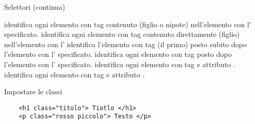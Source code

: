 \begin{frame}[fragile]{Selettori (continua)}\transfade\centering
  \begin{description}[<+->]
    \itemtt[\#id \mintcss{p}] identifica ogni elemento con tag  contenuto (figlio o nipote) nell'elemento con l' specificato.
    \itemtt[\#id>\mintcss{p}] identifica ogni elemento con tag  contenuto direttamente (figlio) nell'elemento con l'
    \smallskip
    \itemtt[\#id+\mintcss{p}] identifica l'elemento con tag  (il primo) posto subito dopo l'elemento con l' specificato.
     identifica ogni elemento con tag  posto dopo l'elemento con l' specificato.
    \smallskip
     identifica ogni elemento con tag  e attributo .
    \itemtt[\mintcss{a[target=_blank]}] identifica ogni elemento con tag  e attributo .
  \end{description}
\end{frame}

\begin{frame}[fragile]{Impostare le classi}\transfade\centering
  \begin{verbatim}
    <h1 class="titolo"> Tiotlo </h1>
    <p class="rosso piccolo"> Testo </p>
  \end{verbatim}
\end{frame}
